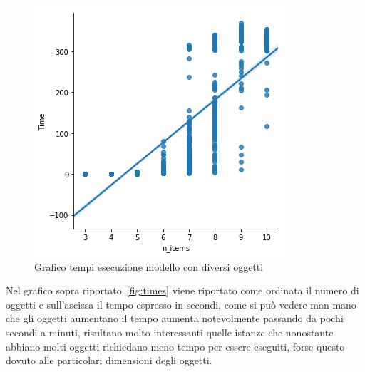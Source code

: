 \begin{figure}[!ht]
	\begin{center} \includegraphics[scale=0.8]{figures/time_nitems}
		\caption[Grafico tempi esecuzione]{Grafico tempi esecuzione modello con diversi oggetti}  
		\label{fig:times}
	\end{center}
\end{figure}

Nel grafico sopra riportato~\eqref{fig:times} viene riportato come ordinata il numero di oggetti e sull'ascissa il tempo espresso in secondi, come si può vedere man mano che gli oggetti aumentano il tempo aumenta notevolmente passando da pochi secondi a minuti, risultano molto interessanti quelle istanze che nonostante abbiano molti oggetti richiedano meno tempo per essere eseguiti, forse questo dovuto alle particolari dimensioni degli oggetti.

